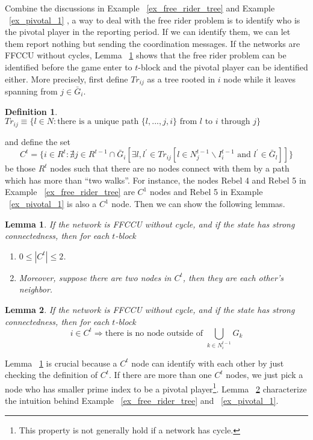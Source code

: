 \documentclass[12pt,letter]{article}
\newtheorem{lemma}{Lemma}[section]
\newtheorem{definition}{Definition}[section]
\theoremstyle{definition}
\theoremstyle{remark}
\theoremstyle{claim}
\begin{document}
Combine the discussions in Example ~\ref{ex_free_rider_tree} and Example ~\ref{ex_pivotal_1} , a way to deal with the free rider problem is to identify who is the pivotal player in the reporting period. If we can identify them, we can let them report nothing but sending the coordination messages. If the networks are FFCCU without cycles, Lemma ~\ref{lemma_at_most_two_nodes} shows that the free rider problem can be identified before the game enter to $t$-block and the pivotal player can be identified either. More precisely, first define $Tr_{ij}$ as a tree rooted in $i$ node while it leaves spanning from $j\in \bar{G}_i$.

\begin{definition}
$Tr_{ij}\equiv \{l\in N:\text{there is a unique path $\{l,...,j,i\}$ from $l$ to $i$ through $j$}\}$
\end{definition}
and define the set
\[C^t=\{i\in R^t:\nexists j\in R^{t-1}\cap \bar{G}_i[\exists l,l^{'}\in Tr_{ij}[l\in N^{t-1}_j\backslash I^{t-1}_i \text{ and } l^{'}\in \bar{G}_l]]\}\]
be those $R^t$ nodes such that there are no nodes connect with them by a path which has more than ``two walks''. For instance, the nodes Rebel 4 and Rebel 5 in Example ~\ref{ex_free_rider_tree} are $C^1$ nodes and Rebel 5 in Example ~\ref{ex_pivotal_1} is also a $C^1$ node. Then we can show the following lemmas. 

\begin{lemma}
\label{lemma_at_most_two_nodes}
If the network is FFCCU without cycle, and  if the state has strong connectedness, then for each $t$-block
\begin{enumerate}
\item $0\leq |C^t| \leq 2$.
\item Moreover, suppose there are two nodes in $C^t$, then they are each other's neighbor.
\end{enumerate}
\end{lemma}


\begin{lemma}
\label{lemma_no_node_outside}
If the network is FFCCU without cycle, and if the state has strong connectedness, then for each $t$-block
\[i\in C^t \Rightarrow \text{there is no node outside of }\bigcup_{k\in N^{t-1}_i}G_k\]
\end{lemma}

Lemma ~\ref{lemma_at_most_two_nodes} is crucial because a $C^t$ node can identify with each other by just checking the definition of $C^t$. If there are more than one $C^t$ nodes, we just pick a node who has smaller prime index to be a pivotal player\footnote{This property is not generally hold if a network has cycle.}. Lemma ~\ref{lemma_no_node_outside} characterize the intuition behind Example ~\ref{ex_free_rider_tree} and ~\ref{ex_pivotal_1}.
\end{document}
